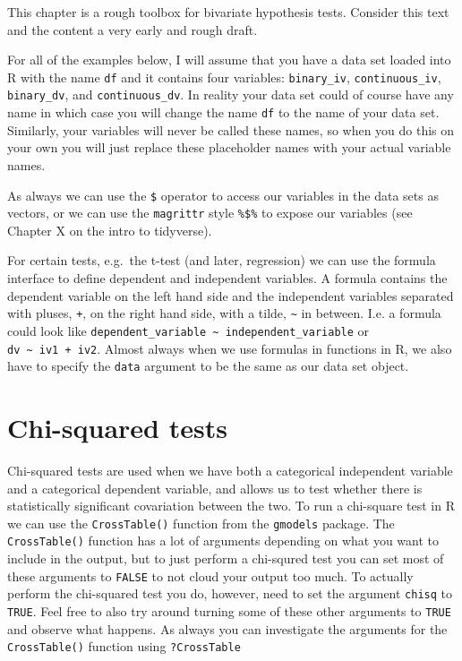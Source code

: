 \documentclass[
]{book}
\begin{document}
This chapter is a rough toolbox for bivariate hypothesis tests. Consider this text and the content a very early and rough draft.

For all of the examples below, I will assume that you have a data set loaded into R with the name \texttt{df} and it contains four variables: \texttt{binary\_iv}, \texttt{continuous\_iv}, \texttt{binary\_dv}, and \texttt{continuous\_dv}. In reality your data set could of course have any name in which case you will change the name \texttt{df} to the name of your data set. Similarly, your variables will never be called these names, so when you do this on your own you will just replace these placeholder names with your actual variable names.

As always we can use the \texttt{\$} operator to access our variables in the data sets as vectors, or we can use the \texttt{magrittr} style \texttt{\%\$\%} to expose our variables (see Chapter X on the intro to tidyverse).

For certain tests, e.g.~the t-test (and later, regression) we can use the formula interface to define dependent and independent variables. A formula contains the dependent variable on the left hand side and the independent variables separated with pluses, \texttt{+}, on the right hand side, with a tilde, \texttt{\textasciitilde{}} in between. I.e. a formula could look like \texttt{dependent\_variable\ \textasciitilde{}\ independent\_variable} or \texttt{dv\ \textasciitilde{}\ iv1\ +\ iv2}. Almost always when we use formulas in functions in R, we also have to specify the \texttt{data} argument to be the same as our data set object.

\hypertarget{chi-squared-tests}{%
\section{Chi-squared tests}\label{chi-squared-tests}}

Chi-squared tests are used when we have both a categorical independent variable and a categorical dependent variable, and allows us to test whether there is statistically significant covariation between the two. To run a chi-square test in R we can use the \texttt{CrossTable()} function from the \texttt{gmodels} package. The \texttt{CrossTable()} function has a lot of arguments depending on what you want to include in the output, but to just perform a chi-squred test you can set most of these arguments to \texttt{FALSE} to not cloud your output too much. To actually perform the chi-squared test you do, however, need to set the argument \texttt{chisq} to \texttt{TRUE}. Feel free to also try around turning some of these other arguments to \texttt{TRUE} and observe what happens. As always you can investigate the arguments for the \texttt{CrossTable()} function using \texttt{?CrossTable}
\end{document}
